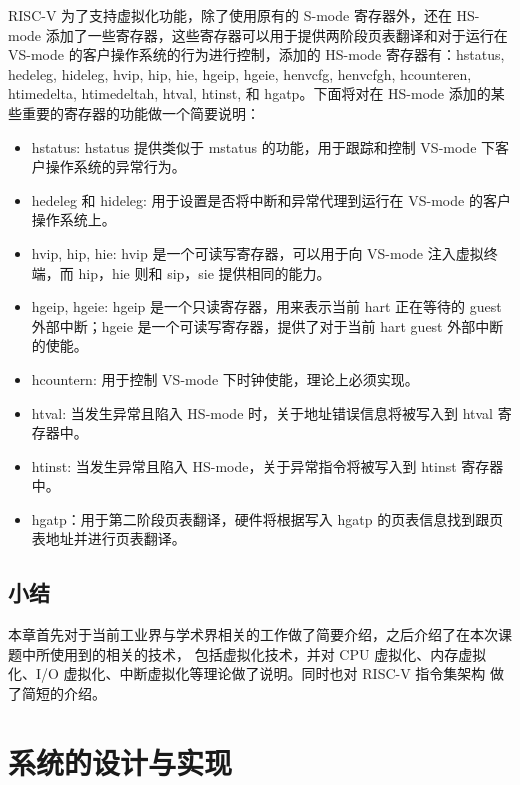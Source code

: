 RISC-V 为了支持虚拟化功能，除了使用原有的 S-mode 寄存器外，还在 HS-mode 添加了一些寄存器，这些寄存器可以用于提供两阶段页表翻译和对于运行在 VS-mode 的客户操作系统的行为进行控制，添加的 HS-mode 寄存器有：hstatus, hedeleg, hideleg, hvip, hip, hie, hgeip, hgeie, henvcfg, henvcfgh, hcounteren, htimedelta, htimedeltah, htval, htinst, 和 hgatp。\cite{riscv_isa}下面将对在 HS-mode 添加的某些重要的寄存器的功能做一个简要说明：

\begin{itemize}
    \item hstatus: hstatus 提供类似于 mstatus 的功能，用于跟踪和控制 VS-mode 下客户操作系统的异常行为。\cite{riscv_isa}
    \item hedeleg 和 hideleg: 用于设置是否将中断和异常代理到运行在 VS-mode 的客户操作系统上。\cite{riscv_isa}
    \item hvip, hip, hie: hvip 是一个可读写寄存器，可以用于向 VS-mode 注入虚拟终端，而 hip，hie 则和 sip，sie 提供相同的能力。\cite{riscv_isa}
    \item hgeip, hgeie: hgeip 是一个只读寄存器，用来表示当前 hart 正在等待的 guest 外部中断；hgeie 是一个可读写寄存器，提供了对于当前 hart guest 外部中断的使能。\cite{riscv_isa}
    \item hcountern: 用于控制 VS-mode 下时钟使能，理论上必须实现。\cite{riscv_isa}
    \item htval: 当发生异常且陷入 HS-mode 时，关于地址错误信息将被写入到 htval 寄存器中。 \cite{riscv_isa}
    \item htinst: 当发生异常且陷入 HS-mode，关于异常指令将被写入到 htinst 寄存器中。\cite{riscv_isa}
    \item hgatp：用于第二阶段页表翻译，硬件将根据写入 hgatp 的页表信息找到跟页表地址并进行页表翻译。\cite{riscv_isa}

\end{itemize}

\section{小结}

本章首先对于当前工业界与学术界相关的工作做了简要介绍，之后介绍了在本次课题中所使用到的相关的技术，
包括虚拟化技术，并对 CPU 虚拟化、内存虚拟化、I/O 虚拟化、中断虚拟化等理论做了说明。同时也对 RISC-V 指令集架构
做了简短的介绍。

\chapter{系统的设计与实现}

